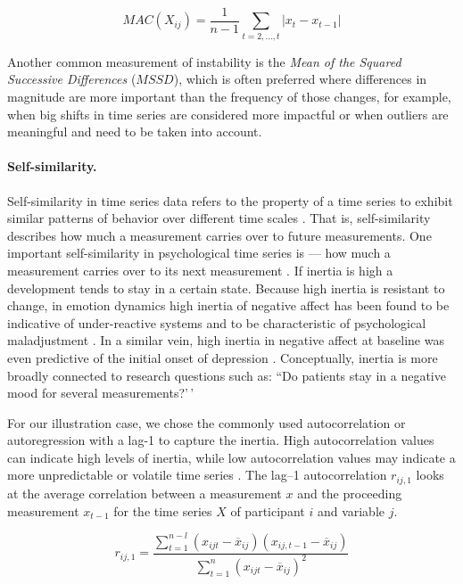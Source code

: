 \begin{equation} \label{eq:mac}
  MAC(X_{ij}) = \frac{1}{n-1} \sum_{t=2, \ldots, t}\left|x_{t}-x_{t-1}\right|
\end{equation}

Another common measurement of instability is the
\textit{Mean of the Squared Successive Differences} (\(MSSD\)), which is
often preferred where differences in magnitude are more important than
the frequency of those changes, for example, when big shifts in time
series are considered more impactful or when outliers are meaningful and
need to be taken into account.

\paragraph{Self-similarity.}

Self-similarity in time series data refers to the property of a time
series to exhibit similar patterns of behavior over different time
scales \citep{dmello2021}. That is, self-similarity describes how much a
measurement carries over to future measurements. One important
self-similarity in psychological time series is  --- how
much a measurement carries over to its next measurement
\citep{kuppens2010, suls1998}. If inertia is high a development tends to
stay in a certain state. Because high inertia is resistant to change, in
emotion dynamics high inertia of negative affect has been found to be
indicative of under-reactive systems and to be characteristic of
psychological maladjustment \citep{kuppens2010}. In a similar vein, high
inertia in negative affect at baseline was even predictive of the
initial onset of depression \citep{kuppens2012}. Conceptually, inertia
is more broadly connected to research questions such as: ``Do patients
stay in a negative mood for several measurements?'\,'

For our illustration case, we chose the commonly used autocorrelation or
autoregression with a lag-1 to capture the inertia. High autocorrelation
values can indicate high levels of inertia, while low autocorrelation
values may indicate a more unpredictable or volatile time series
\citep{dejonckheere2019}. The lag--1 autocorrelation \(r_{ij,1}\) looks
at the average correlation between a measurement \(x\) and the
proceeding measurement \(x_{t-1}\) for the time series \(X\) of
participant \(i\) and variable \(j\).

\begin{equation} \label{eq:ar}
  r_{ij,1} = \frac{\sum_{t=1}^{n-l}(x_{ijt}-\overline{x}_{ij})(x_{ij,t-1}-\overline{x}_{ij})}{\sum_{t=1}^{n}(x_{ijt}-\overline{x}_{ij})^2}
\end{equation}

